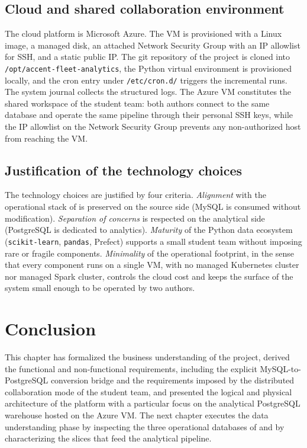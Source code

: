 \subsection{Cloud and shared collaboration environment}
\label{ssec:cloud-collab}
The cloud platform is Microsoft Azure. The VM is provisioned with a Linux image, a managed disk, an attached Network Security Group with an IP allowlist for SSH, and a static public IP. The git repository of the project is cloned into \texttt{/opt/accent-fleet-analytics}, the Python virtual environment is provisioned locally, and the cron entry under \texttt{/etc/cron.d/} triggers the incremental runs. The system journal collects the structured logs. The Azure VM constitutes the shared workspace of the student team: both authors connect to the same database and operate the same pipeline through their personal SSH keys, while the IP allowlist on the Network Security Group prevents any non-authorized host from reaching the VM.

\subsection{Justification of the technology choices}
The technology choices are justified by four criteria. \emph{Alignment} with the operational stack of \hostorg{} is preserved on the source side (MySQL is consumed without modification). \emph{Separation of concerns} is respected on the analytical side (PostgreSQL is dedicated to analytics). \emph{Maturity} of the Python data ecosystem (\texttt{scikit-learn}, \texttt{pandas}, Prefect) supports a small student team without imposing rare or fragile components. \emph{Minimality} of the operational footprint, in the sense that every component runs on a single VM, with no managed Kubernetes cluster nor managed Spark cluster, controls the cloud cost and keeps the surface of the system small enough to be operated by two authors.

\section{Conclusion}
This chapter has formalized the business understanding of the project, derived the functional and non-functional requirements, including the explicit MySQL-to-PostgreSQL conversion bridge and the requirements imposed by the distributed collaboration mode of the student team, and presented the logical and physical architecture of the platform with a particular focus on the analytical PostgreSQL warehouse hosted on the Azure VM. The next chapter executes the data understanding phase by inspecting the three operational databases of \hostorg{} and by characterizing the slices that feed the analytical pipeline.
